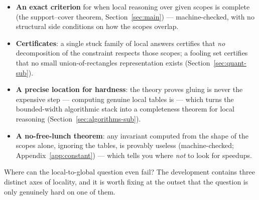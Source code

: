 \documentclass[11pt]{article}
\begin{document}
\begin{itemize}
\item \textbf{An exact criterion} for when local reasoning over given
  scopes is complete (the support--cover theorem,
  Section~\ref{sec:main}) --- machine-checked, with no structural
  side conditions on how the scopes overlap.
\item \textbf{Certificates}: a single stuck family of local answers
  certifies that \emph{no} decomposition of the constraint respects
  those scopes; a fooling set certifies that no small
  union-of-rectangles representation exists
  (Section~\ref{sec:quant-sub}).
\item \textbf{A precise location for hardness}: the theory proves
  gluing is never the expensive step --- computing genuine local
  tables is --- which turns the bounded-width algorithmic stack into
  a completeness theorem for local reasoning
  (Section~\ref{sec:algorithms-sub}).
\item \textbf{A no-free-lunch theorem}: any invariant computed from
  the shape of the scopes alone, ignoring the tables, is provably
  useless (machine-checked; Appendix~\ref{app:constant}) --- which
  tells you where \emph{not} to look for speedups.
\end{itemize}

Where can the local-to-global question even fail?  The development
contains three distinct axes of locality, and it is worth fixing at
the outset that the question is only genuinely hard on one of them.
\end{document}
